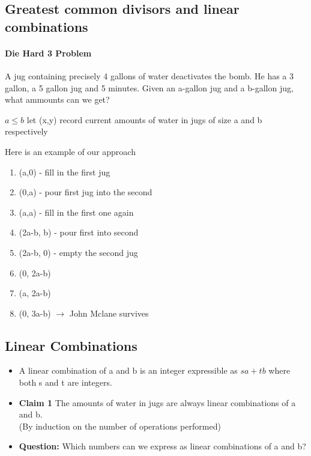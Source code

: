 \documentclass[9pt, letterpaper, oneside]{article}
\begin{document}
\subsection{Greatest common divisors and linear combinations}

\paragraph{Die Hard 3 Problem} A jug containing precisely 4 gallons of water deactivates the bomb. He has a 3 gallon, a 5 gallon jug and 5 minutes. Given an a-gallon jug and a b-gallon jug, what ammounts can we get?

$a \leq b$ let (x,y) record current amounts of water in jugs of size a and b respectively

Here is an example of our approach
\begin{enumerate}
    \item (a,0) - fill in the first jug
    \item (0,a) - pour first jug into the second
    \item (a,a) - fill in the first one again
    \item (2a-b, b) - pour first into second
    \item (2a-b, 0) - empty the second jug
    \item (0, 2a-b)
    \item (a, 2a-b)
    \item (0, 3a-b) $\to$ John Mclane survives
\end{enumerate}

\subsection{Linear Combinations}
\begin{itemize}
    \item A linear combination of a and b is an integer expressible as $sa + tb$ where both s and t are integers.
    \item \textbf{Claim 1} The amounts of water in jugs are always linear combinations of a and b.\\
    (By induction on the number of operations performed)\\
    \item \textbf{Question:} Which numbers can we express as linear combinations of a and b?
\end{itemize}


\end{document}

